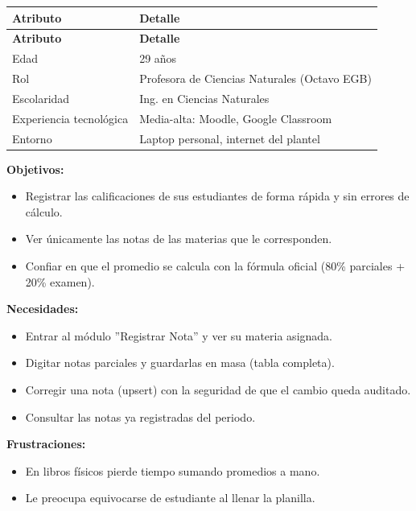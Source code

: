 \documentclass[11pt,a4paper]{article}
\begin{document}
{\small
\begin{longtable}{|p{}|p{}|}
\rowcolor{UTECblue}\color{white}\bfseries Atributo & \color{white}\bfseries Detalle \\ \hline
\endfirsthead
\rowcolor{UTECblue}\color{white}\bfseries Atributo & \color{white}\bfseries Detalle \\ \hline
\endhead
Edad & 29 años \\ \hline
Rol & Profesora de Ciencias Naturales (Octavo EGB) \\ \hline
Escolaridad & Ing. en Ciencias Naturales \\ \hline
Experiencia tecnológica & Media-alta: Moodle, Google Classroom \\ \hline
Entorno & Laptop personal, internet del plantel \\ \hline
\end{longtable}}


\textbf{Objetivos:}


\begin{itemize}[leftmargin=*]
\item Registrar las calificaciones de sus estudiantes de forma rápida y sin errores de cálculo.
\item Ver únicamente las notas de las materias que le corresponden.
\item Confiar en que el promedio se calcula con la fórmula oficial (80\% parciales + 20\% examen).
\end{itemize}


\textbf{Necesidades:}


\begin{itemize}[leftmargin=*]
\item Entrar al módulo ''Registrar Nota'' y ver su materia asignada.
\item Digitar notas parciales y guardarlas en masa (tabla completa).
\item Corregir una nota (upsert) con la seguridad de que el cambio queda auditado.
\item Consultar las notas ya registradas del periodo.
\end{itemize}


\textbf{Frustraciones:}


\begin{itemize}[leftmargin=*]
\item En libros físicos pierde tiempo sumando promedios a mano.
\item Le preocupa equivocarse de estudiante al llenar la planilla.
\end{itemize}
\end{document}
